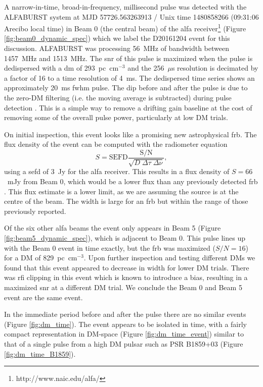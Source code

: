 \documentclass[a4paper,fleqn,usenatbib]{mnras}
\begin{document}
A narrow-in-time, broad-in-frequency, millisecond pulse was detected with the
ALFABURST system at MJD 57726.563263913 / Unix time 1480858266 (09:31:06 Arecibo
local time) in Beam 0 (the central beam) of the \gls{alfa}
receiver\footnote{http://www.naic.edu/alfa/} (Figure
\ref{fig:beam0_dynamic_spec}) which we label the D20161204 event for this
discussion. ALFABURST was processing 56~MHz of bandwidth between 1457~MHz and
1513~MHz. The \gls{snr} of this pulse is maximized when the pulse is dedispersed
with a \gls{dm} of 293~pc~cm$^{-3}$ and the 256~$\mu$s resolution is decimated
by a factor of 16 to a time resolution of 4~ms. The dedispersed time series shows
an approximately 20~ms \gls{fwhm} pulse.  The dip before and after the pulse is
due to the zero-DM filtering (i.e. the moving average is subtracted) during
pulse detection \citep{2009MNRAS.395..410E}. This is a simple way to remove a
drifting gain baseline at the cost of removing some of the overall pulse power,
particularly at low DM trials.

On initial inspection, this event looks like a promising new astrophysical
\gls{frb}. The flux density of the event can be computed with the radiometer
equation
%
$$
S = \textrm{SEFD} \frac{\textrm{S/N}}{\sqrt{D \; \Delta \tau \;
\Delta \nu}},
$$
%
using a \gls{sefd} of 3~Jy for the \gls{alfa} receiver. This results in a flux
density of $S = 66$~mJy from Beam 0, which would be a lower flux than any
previously detected \gls{frb} \citep{2016PASA...33...45P}. This flux estimate is
a lower limit, as we are assuming the source is at the centre of the beam. The
width is large for an \gls{frb} but within the range of those previously
reported.

Of the six other \gls{alfa} beams the event only appears in Beam 5 (Figure
\ref{fig:beam5_dynamic_spec}), which is adjacent to Beam 0.  This pulse lines up
with the Beam 0 event in time exactly, but the \gls{frb} was maximized
($S/N=16$) for a DM of 829~pc~cm$^{-3}$. Upon further inspection and testing
different DMs we found that this event appeared to decrease in width for lower
DM trials. There was \gls{rfi} clipping in this event which is known to
introduce a bias, resulting in a maximized \gls{snr} at a different DM trial.
We conclude the Beam 0 and Beam 5 event are the same event.

In the immediate period before and after the pulse there are no similar events
(Figure \ref{fig:dm_time}). The event appears to be isolated in time, with a
fairly compact representation in DM-space (Figure \ref{fig:dm_time_event})
similar to that of a single pulse from a high DM pulsar such as PSR B1859+03
(Figure \ref{fig:dm_time_B1859}).
\end{document}
